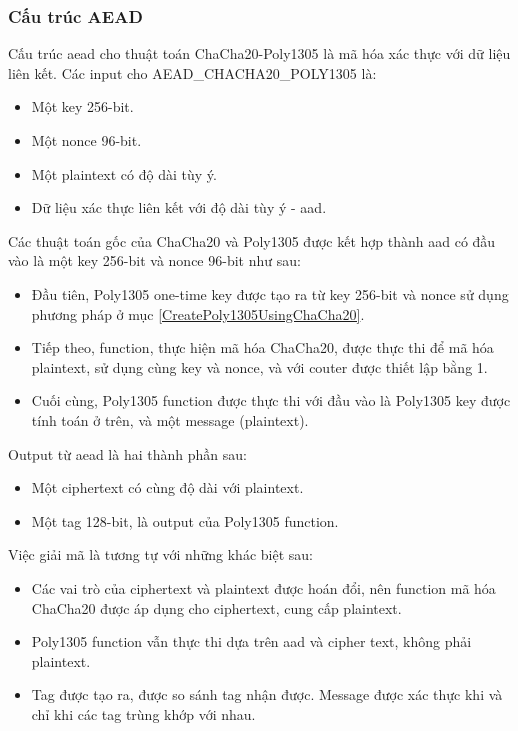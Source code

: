 \subsubsection{Cấu trúc AEAD}

Cấu trúc \acrshort{aead} cho thuật toán ChaCha20-Poly1305 là mã hóa xác thực với dữ liệu liên kết. Các input cho AEAD\_CHACHA20\_POLY1305 là:

\begin{itemize}
    \item Một key 256-bit.
    \item Một nonce 96-bit.
    \item Một plaintext có độ dài tùy ý.
    \item Dữ liệu xác thực liên kết với độ dài tùy ý - \acrfull{aad}.
\end{itemize}

Các thuật toán gốc của ChaCha20 và Poly1305 được kết hợp thành \acrshort{aad} có đầu vào là một key 256-bit và nonce 96-bit như sau:

\begin{itemize}
    \item Đầu tiên, Poly1305 one-time key được tạo ra từ key 256-bit và nonce sử dụng phương pháp ở mục \ref{CreatePoly1305UsingChaCha20}.
    \item Tiếp theo, function, thực hiện mã hóa ChaCha20, được thực thi để mã hóa plaintext, sử dụng cùng key và nonce, và với couter được thiết lập bằng 1.
    \item Cuối cùng, Poly1305 function được thực thi với đầu vào là Poly1305 key được tính toán ở trên, và một message (plaintext).
\end{itemize}

Output từ \acrshort{aead} là hai thành phần sau:
\begin{itemize}
    \item Một ciphertext có cùng độ dài với plaintext.
    \item Một tag 128-bit, là output của Poly1305 function.
\end{itemize}

Việc giải mã là tương tự với những khác biệt sau:
\begin{itemize}
    \item Các vai trò của ciphertext và plaintext được hoán đổi, nên function mã hóa ChaCha20 được áp dụng cho ciphertext, cung cấp plaintext.
    \item Poly1305 function vẫn thực thi dựa trên \acrshort{aad} và cipher text, không phải plaintext.
    \item Tag được tạo ra, được so sánh tag nhận được. Message được xác thực khi và chỉ khi các tag trùng khớp với nhau.
\end{itemize}